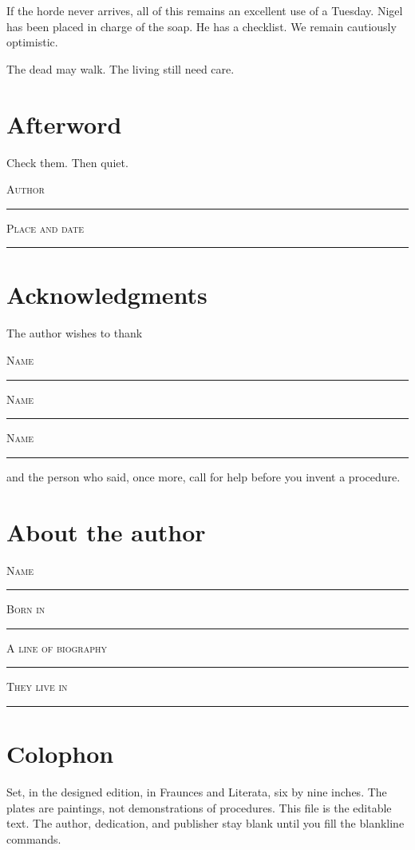 \documentclass[10pt,openright]{book}
\newcommand{\blankline}[1]{%
  \par\medskip
  {\small\scshape #1}\par\noindent
  \rule{0.8\textwidth}{0.4pt}\par\smallskip
}
\begin{document}
If the horde never arrives, all of this remains an excellent use of a Tuesday. Nigel has been placed in charge of the soap. He has a checklist. We remain cautiously optimistic.

The dead may walk. The living still need care.


\backmatter
\chapter*{Afterword}
Check them. Then quiet.
\blankline{Author}
\blankline{Place and date}
\chapter*{Acknowledgments}
The author wishes to thank
\blankline{Name}
\blankline{Name}
\blankline{Name}
and the person who said, once more, call for help before you invent a procedure.
\chapter*{About the author}
\blankline{Name}
\blankline{Born in}
\blankline{A line of biography}
\blankline{They live in}
\chapter*{Colophon}
Set, in the designed edition, in Fraunces and Literata, six by nine inches.
The plates are paintings, not demonstrations of procedures.
This file is the editable text. The author, dedication, and publisher stay blank until you fill the blankline commands.
\end{document}
